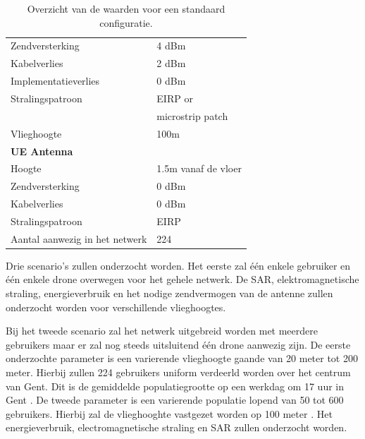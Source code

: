 \documentclass[twocolumn]{phdsymp_dutch}
\begin{document}
\begin{table}[!htb]
\begin{tabular}[t]{ll}
        \hspace{3mm}  Zendversterking           & 4 dBm   \\ 
        \hspace{3mm}  Kabelverlies               & 2 dBm   \\ 
        \hspace{3mm}  Implementatieverlies       & 0 dBm   \\
        \hspace{3mm}  Stralingspatroon         & EIRP or\\
         \hspace{3mm}                           & microstrip patch\\
        \hspace{3mm}  Vlieghoogte                & 100m  \\
        \hline
        \multicolumn{2}{l}{\textbf{UE Antenna}} \\
        \hline 
        \hspace{3mm} Hoogte                     & 1.5m vanaf de vloer      \\ 
        \hspace{3mm} Zendversterking                      & 0 dBm   \\ 
        \hspace{3mm} Kabelverlies              & 0 dBm   \\ 
        \hspace{3mm} Stralingspatroon         & EIRP  \\
        \hspace{3mm} Aantal aanwezig in het netwerk         & 224  \\
        \toprule
\end{tabular}
\caption{Overzicht van de waarden voor een standaard configuratie.}
\label{table:defaultconf}
\end{table}

Drie scenario's zullen onderzocht worden. Het eerste zal \'e\'en enkele gebruiker en 
 \'e\'en enkele drone overwegen 
voor het gehele netwerk. De \gls{SAR}, elektromagnetische straling, energieverbruik  en 
het nodige zendvermogen van de antenne zullen onderzocht worden voor verschillende vlieghoogtes.

Bij het tweede scenario zal het netwerk uitgebreid worden met meerdere gebruikers maar 
er zal nog steeds uitsluitend  \'e\'en drone aanwezig zijn. De eerste onderzochte parameter 
is een varierende vlieghoogte gaande van 20 meter tot 200 meter. Hierbij zullen 224 gebruikers 
uniform verdeerld worden over het centrum van Gent. Dit is de gemiddelde populatiegrootte op 
een werkdag om 17 uur in Gent \cite{J2}.
De tweede parameter is een varierende populatie lopend van 50 tot 600 gebruikers. Hierbij 
zal de vlieghooghte vastgezet worden op 100 meter \cite{J2}.
Het energieverbruik, electromagnetische straling en \gls{SAR} zullen onderzocht worden.
\end{document}
